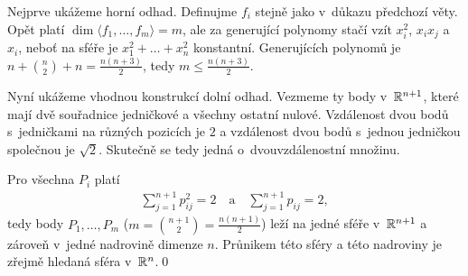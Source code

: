 \dk Nejprve ukážeme horní odhad. Definujme $f_i$ stejně jako v~důkazu předchozí věty. Opět platí $\dim\langle f_1,\dots,f_m\rangle=m$, ale za generující polynomy stačí vzít $x_i^2$, $x_ix_j$ a $x_i$, neboť na sféře je $x_1^2+\dots+x_n^2$ konstantní. Generujících polynomů je $n+\binom n2+n=\frac{n(n+3)}2$, tedy $m\leq\frac{n(n+3)}2$.

Nyní ukážeme vhodnou konstrukcí dolní odhad. Vezmeme ty body v~$\mathbb{R}^{n+1}$, které mají dvě souřadnice jedničkové a všechny ostatní nulové. Vzdálenost dvou bodů s~jedničkami na různých pozicích je $2$ a vzdálenost dvou bodů s~jednou jedničkou společnou je $\sqrt 2$. Skutečně se tedy jedná o~dvouvzdálenostní množinu.

Pro všechna $P_i$ platí
\begin{align}
\sum_{j=1}^{n+1}p_{ij}^2=2\quad\text{a}\quad\sum_{j=1}^{n+1}p_{ij}=2,
\end{align}
tedy body $P_1,\dots,P_m$ ($m=\binom{n+1}2=\frac{n(n+1)}2$) leží na jedné sféře v~$\mathbb{R}^{n+1}$ a zároveň v~jedné nadrovině dimenze $n$. Průnikem této sféry a této nadroviny je zřejmě hledaná sféra v~$\mathbb{R}^n$.\qed